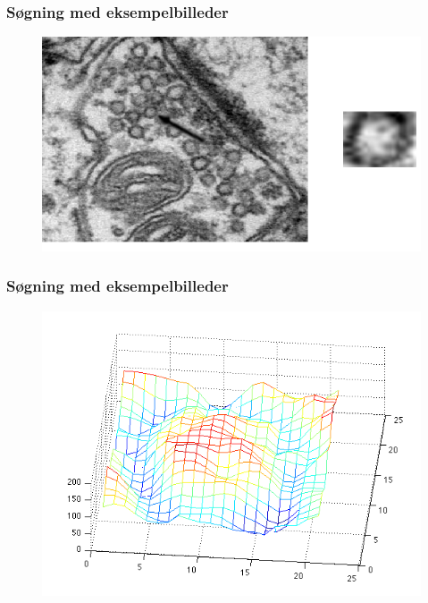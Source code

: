 \begin{frame}
\frametitle{Søgning med eksempelbilleder}
\begin{figure}[H]
	\centering
	\includegraphics[scale=0.4]{img/finalmethod/cell2.png}
\end{figure}
\end{frame}

\begin{frame}
\frametitle{Søgning med eksempelbilleder}
\begin{figure}[H]
	\centering
	\includegraphics[scale=0.4]{img/ves/mesh.png}
\end{figure}
\end{frame}

